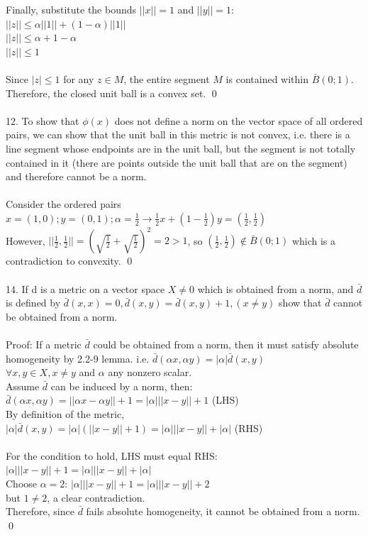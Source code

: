 \documentclass{article}
\begin{document}
Finally, substitute the bounds $||x|| = 1$ and $ ||y|| = 1$:
\\ $||z|| \leq \alpha||1|| + (1-\alpha)||1||$ \\
$||z|| \leq \alpha + 1 -\alpha$ \\
$||z|| \leq 1$
\\\\
Since $|z| \leq 1$ for any $z \in M$, the entire segment $M$ is contained within $\bar{B}(0; 1)$. Therefore, the closed unit ball is a convex set.
\qed
\\\\
12. To show that $\phi(x)$ does not define a norm on the vector space of all ordered pairs, we can show that the unit ball in this metric is not convex, i.e. there is a line segment whose endpoints are in the unit ball, but the segment is not totally contained in it (there are points outside the unit ball that are on the segment) and therefore cannot be a norm. \\\\
Consider the ordered pairs $ x = (1,0); y = (0,1); \alpha = \frac{1}{2}\to \frac{1}{2}x + (1-\frac{1}{2})y = (\frac{1}{2}, \frac{1}{2}) $
\\
However, $||\frac{1}{2}, \frac{1}{2}|| =(\sqrt{\frac{1}{2}}+\sqrt{\frac{1}{2}})^2 = 2 > 1$, so $(\frac{1}{2}, \frac{1}{2}) \notin \bar{B}(0;1)$ which is a contradiction to convexity. \qed
\\
\\
14. If d is a metric on a vector space $X \neq {0}$ which is obtained from a norm, and $\bar{d}$ is defined by $\bar{d}(x,x) = 0, \bar{d}(x,y) = \bar{d}(x,y) + 1, (x\neq y)$
show that $\bar{d}$ cannot be obtained from a norm. 
\\
\\
Proof:
If a metric $\bar{d}$ could be obtained from a norm, then it must satisfy absolute homogeneity by 2.2-9 lemma. i.e. $\bar{d}(\alpha x, \alpha y) = |\alpha|\bar{d}(x,y)$ \\
$\forall x,y \in X, x\neq y$ and $\alpha$ any nonzero scalar.
\\
Assume $\bar{d}$ can be induced by a norm, then: 
\\$\bar{d}(\alpha x, \alpha y) = ||\alpha x - \alpha y|| + 1 = |\alpha|||x-y|| + 1$ (LHS) \\
By definition of the metric, 
\\$|\alpha|\bar{d}(x,y) = |\alpha|(||x-y||+1) = |\alpha|||x-y|| + |\alpha|$ (RHS)
\\
\\
For the condition to hold, LHS must equal RHS: 
$|\alpha|||x-y||+1 = |\alpha|||x-y||+ |\alpha|$ 
\\
Choose $\alpha = 2$: $|\alpha|||x-y||+1 = |\alpha|||x-y||+ 2$ \\
but $1 \neq 2$, a clear contradiction.
\\
Therefore, since $\bar{d}$ fails absolute homogeneity, it cannot be obtained from a norm. \qed
\end{document}
